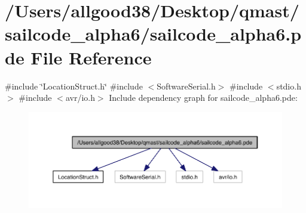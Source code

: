 \hypertarget{sailcode__alpha6_8pde}{
\section{/\-Users/allgood38/\-Desktop/qmast/sailcode\-\_\-alpha6/sailcode\-\_\-alpha6.pde \-File \-Reference}
\label{sailcode__alpha6_8pde}
}
{\ttfamily \#include \char`\"{}\-Location\-Struct.\-h\char`\"{}}\*
{\ttfamily \#include $<$\-Software\-Serial.\-h$>$}\*
{\ttfamily \#include $<$stdio.\-h$>$}\*
{\ttfamily \#include $<$avr/io.\-h$>$}\*
\-Include dependency graph for sailcode\-\_\-alpha6.pde\-:\nopagebreak
\begin{figure}[H]
\begin{center}
\leavevmode
\includegraphics[width=350pt]{sailcode__alpha6_8pde__incl}
\end{center}
\end{figure}
